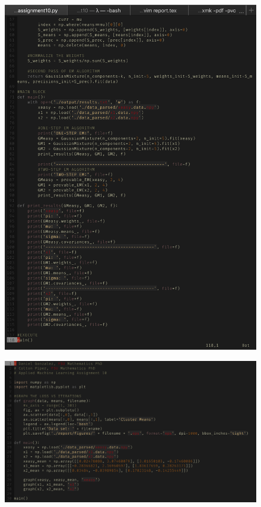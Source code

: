 \documentclass[UTF8]{article}
\begin{document}
\begin{figure}[H]
    \centering
    \includegraphics[scale=0.85]{./figures/narrowcode2.png}
\end{figure}
\begin{figure}[H]
    \centering
    \includegraphics[scale=0.75]{./figures/graph.png}
\end{figure}
\end{document}
